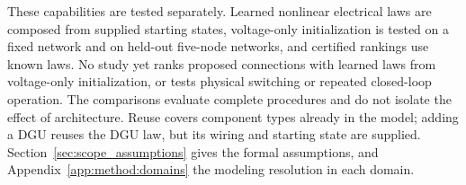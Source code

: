 These capabilities are tested separately.
Learned nonlinear electrical laws are composed from supplied starting states, voltage-only initialization is tested on a fixed network and on held-out five-node networks, and certified rankings use known laws.
No study yet ranks proposed connections with learned laws from voltage-only initialization, or tests physical switching or repeated closed-loop operation.
The comparisons evaluate complete procedures and do not isolate the effect of architecture.
Reuse covers component types already in the model; adding a DGU reuses the DGU law, but its wiring and starting state are supplied.
Section~\ref{sec:scope_assumptions} gives the formal assumptions, and Appendix~\ref{app:method:domains} the modeling resolution in each domain.
